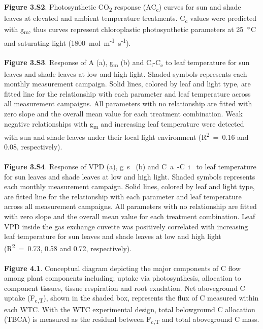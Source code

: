 \documentclass[a4paper]{article}\usepackage[]{graphicx}\usepackage[]{color}
\begin{document}
\\
\\
\textbf{Figure 3.S2}. Photosynthetic CO\textsubscript{2} response (AC\textsubscript{c}) curves for sun and shade leaves at elevated and ambient temperature treatments. C\textsubscript{c} values were predicted with g\textsubscript{m}, thus curves represent chloroplastic photosynthetic parameters at 25~$\degree$C and saturating light (1800~{\textmugreek}mol~m\textsuperscript{-1}~s\textsuperscript{-1}). 
\\
\\
\textbf{Figure 3.S3}. Response of A (a), g\textsubscript{m} (b) and C\textsubscript{i}-C\textsubscript{c} to leaf temperature for sun leaves and shade leaves at low and high light. Shaded symbols represents each monthly measurement campaign. Solid lines, colored by leaf and light type, are fitted line for the relationship with each parameter and leaf temperature across all measurement campaigns. All parameters with no relationship are fitted with zero slope and the overall mean value for each treatment combination. Weak negative relationships with g\textsubscript{m} and increasing leaf temperature were detected with sun and shade leaves under their local light environment (R\textsuperscript{2}~=~0.16 and 0.08, respectively). 
\\
\\
\textbf{Figure 3.S4}. Response of VPD (a), g~s~ (b) and C~a~-C~i~ to leaf temperature for sun leaves and shade leaves at low and high light. Shaded symbols represents each monthly measurement campaign. Solid lines, colored by leaf and light type, are fitted line for the relationship with each parameter and leaf temperature across all measurement campaigns. All parameters with no relationship are fitted with zero slope and the overall mean value for each treatment combination. Leaf VPD inside the gas exchange cuvette was positively correlated with increasing leaf temperature for sun leaves and shade leaves at low and high light (R\textsuperscript{2}~=~0.73, 0.58 and 0.72, respectively).
\\
\\
\textbf{Figure 4.1}. Conceptual diagram depicting the major components of C flow among plant components including; uptake via photosynthesis, allocation to component tissues, tissue respiration and root exudation. Net aboveground C uptake (F\textsubscript{c,T}), shown in the shaded box, represents the flux of C measured within each WTC. With the WTC experimental design, total belowground C allocation (TBCA) is measured as the residual between F\textsubscript{c,T} and total aboveground C mass. 
\end{document}
